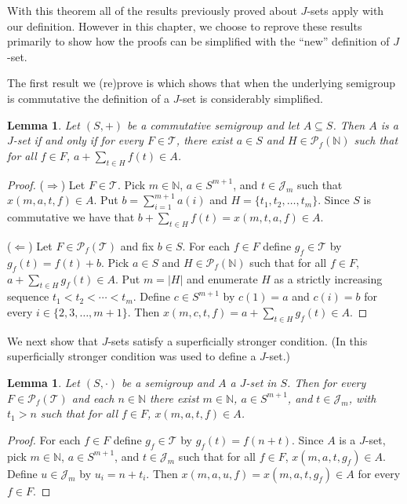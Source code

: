 \documentclass[12pt]{article}
\theoremstyle{plain}
\newtheorem{lem}[thm]{Lemma}
\theoremstyle{definition}
\newcommand{\bbN}{\mathbb{N}}
\newcommand{\calJ}{\mathcal{J}}
\newcommand{\calT}{\mathcal{T}}
\newcommand{\Pf}{\mathcal{P}_f}
\begin{document}
With this theorem all of the results previously proved about $J$-sets apply  with our definition.
However in this chapter, we choose to reprove these results primarily to show how the proofs can be simplified with the ``new'' definition of $J$-set.

The first result we (re)prove is \cite[Lemma 2.4]{Hindman:2010fk} which shows that when the underlying semigroup is commutative the definition of a $J$-set is considerably simplified. 

\begin{lem}
  Let $(S, +)$ be a commutative semigroup and let $A \subseteq S$. 
  Then $A$ is a $J$-set if and only if for every $F \in \calT$, there exist $a \in S$ and $H \in \Pf(\bbN)$ such that for all $f \in F$, $a + \sum_{t \in H} f(t) \in A$.
\end{lem}
\begin{proof}
  ($\Rightarrow$)
  Let $F \in \calT$.
  Pick $m \in \bbN$, $a \in S^{m+1}$, and $t \in \calJ_m$ such that $x(m, a, t, f) \in A$.
  Put $b = \sum_{i=1}^{m+1} a(i)$ and $H = \{t_1, t_2, \ldots, t_m\}$.
  Since $S$ is commutative we have that $b + \sum_{t \in H} f(t) = x(m, t, a, f) \in A$.

  ($\Leftarrow$)
  Let $F \in \Pf(\calT)$ and fix $b \in S$.
  For each $f \in F$ define $g_f \in \calT$ by $g_f(t) = f(t)+b$. 
  Pick $a \in S$ and $H \in \Pf(\bbN)$ such that for all $f \in F$, $a + \sum_{t \in H} g_f(t) \in A$. 
  Put $m = |H|$ and enumerate $H$ as a strictly increasing sequence $t_1 < t_2 < \cdots < t_m$. 
  Define $c \in S^{m+1}$ by $c(1) = a$ and $c(i) = b$ for every $i \in \{2, 3, \ldots, m+1\}$.
  Then $x(m, c, t, f) = a + \sum_{t \in H} g_f(t) \in A$.
\end{proof}

We next show that $J$-sets satisfy a superficially stronger condition. 
(In \cite[Definition 3.3(e)]{De:2008uq} this superficially stronger condition was used to define a $J$-set.)

\begin{lem}
  \label{lem:jset-start}
  Let $(S, \cdot)$ be a semigroup and $A$ a $J$-set in $S$.
  Then for every $F \in \Pf(\calT)$ and each $n \in \bbN$ there exist $m \in \bbN$, $a \in S^{m+1}$, and $t \in \calJ_m$, with $t_1 > n$ such that for all $f \in F$, $x(m, a, t, f) \in A$.
\end{lem}
\begin{proof}
  For each $f \in F$ define $g_f \in \calT$ by $g_f(t) = f(n+t)$.
  Since $A$ is a $J$-set, pick $m \in \bbN$, $a \in S^{m+1}$, and $t \in \calJ_m$ such that for all $f \in F$, $x(m, a, t, g_f) \in A$. 
  Define $u \in \calJ_m$ by $u_i =  n + t_i$.
  Then $x(m, a, u, f) = x(m, a, t, g_f) \in A$ for every $f \in F$.
\end{proof}
\end{document}

